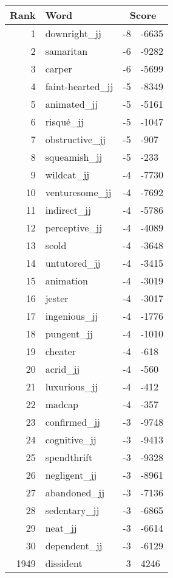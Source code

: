\begin{longtable}[!htbp]{| rlr@{.}l |}
    \hline
    \textbf{Rank} & \textbf{Word} & \multicolumn{2}{c|}{\textbf{Score}} \\
    \hline
    \endhead
    1 & downright\_jj & -8 & -6635 \\
    2 & samaritan & -6 & -9282 \\
    3 & carper & -6 & -5699 \\
    4 & faint-hearted\_jj & -5 & -8349 \\
    5 & animated\_jj & -5 & -5161 \\
    6 & risqué\_jj & -5 & -1047 \\
    7 & obstructive\_jj & -5 & -907 \\
    8 & squeamish\_jj & -5 & -233 \\
    9 & wildcat\_jj & -4 & -7730 \\
    10 & venturesome\_jj & -4 & -7692 \\
    11 & indirect\_jj & -4 & -5786 \\
    12 & perceptive\_jj & -4 & -4089 \\
    13 & scold & -4 & -3648 \\
    14 & untutored\_jj & -4 & -3415 \\
    15 & animation & -4 & -3019 \\
    16 & jester & -4 & -3017 \\
    17 & ingenious\_jj & -4 & -1776 \\
    18 & pungent\_jj & -4 & -1010 \\
    19 & cheater & -4 & -618 \\
    20 & acrid\_jj & -4 & -560 \\
    21 & luxurious\_jj & -4 & -412 \\
    22 & madcap & -4 & -357 \\
    23 & confirmed\_jj & -3 & -9748 \\
    24 & cognitive\_jj & -3 & -9413 \\
    25 & spendthrift & -3 & -9328 \\
    26 & negligent\_jj & -3 & -8961 \\
    27 & abandoned\_jj & -3 & -7136 \\
    28 & sedentary\_jj & -3 & -6865 \\
    29 & neat\_jj & -3 & -6614 \\
    30 & dependent\_jj & -3 & -6129 \\
    1949 & dissident & 3 & 4246 \\

\end{longtable}
